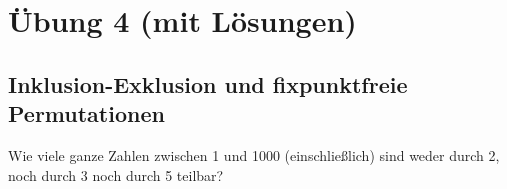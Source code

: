 \section{Übung 4 (mit Lösungen)}
\subsection{Inklusion-Exklusion und fixpunktfreie Permutationen}

\begin{aufgabe}[Aufgabe 1]
Wie viele ganze Zahlen zwischen 1 und 1000 (einschließlich) sind weder durch 2, noch durch 3 noch durch 5 teilbar?
\end{aufgabe}


